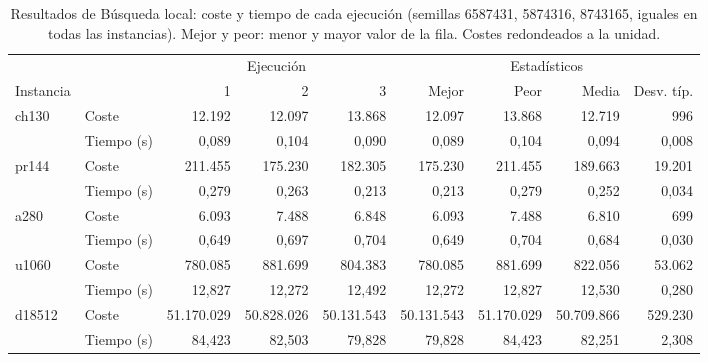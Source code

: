 \begin{table}[H]
\centering\small\setlength{\tabcolsep}{4pt}\renewcommand{\arraystretch}{1.15}
\begin{adjustbox}{max width=\textwidth}
\begin{tabular}{llrrrrrrr}
\toprule
 & & \multicolumn{3}{c}{Ejecución} & \multicolumn{4}{c}{Estadísticos} \\
\cmidrule(lr){3-5}\cmidrule(lr){6-9}
Instancia & & 1 & 2 & 3 & Mejor & Peor & Media & Desv. típ. \\
\midrule
\rowcolor{gray!10}ch130 & Coste & 12{.}192 & 12{.}097 & 13{.}868 & 12{.}097 & 13{.}868 & 12{.}719 & 996 \\
\rowcolor{gray!10} & Tiempo (s) & 0{,}089 & 0{,}104 & 0{,}090 & 0{,}089 & 0{,}104 & 0{,}094 & 0{,}008 \\
pr144 & Coste & 211{.}455 & 175{.}230 & 182{.}305 & 175{.}230 & 211{.}455 & 189{.}663 & 19{.}201 \\
 & Tiempo (s) & 0{,}279 & 0{,}263 & 0{,}213 & 0{,}213 & 0{,}279 & 0{,}252 & 0{,}034 \\
\rowcolor{gray!10}a280 & Coste & 6{.}093 & 7{.}488 & 6{.}848 & 6{.}093 & 7{.}488 & 6{.}810 & 699 \\
\rowcolor{gray!10} & Tiempo (s) & 0{,}649 & 0{,}697 & 0{,}704 & 0{,}649 & 0{,}704 & 0{,}684 & 0{,}030 \\
u1060 & Coste & 780{.}085 & 881{.}699 & 804{.}383 & 780{.}085 & 881{.}699 & 822{.}056 & 53{.}062 \\
 & Tiempo (s) & 12{,}827 & 12{,}272 & 12{,}492 & 12{,}272 & 12{,}827 & 12{,}530 & 0{,}280 \\
\rowcolor{gray!10}d18512 & Coste & 51{.}170{.}029 & 50{.}828{.}026 & 50{.}131{.}543 & 50{.}131{.}543 & 51{.}170{.}029 & 50{.}709{.}866 & 529{.}230 \\
\rowcolor{gray!10} & Tiempo (s) & 84{,}423 & 82{,}503 & 79{,}828 & 79{,}828 & 84{,}423 & 82{,}251 & 2{,}308 \\
\bottomrule
\end{tabular}
\end{adjustbox}
\caption[Resultados de Búsqueda local]{Resultados de Búsqueda local: coste y tiempo de cada ejecución (semillas 6587431, 5874316, 8743165, iguales en todas las instancias). Mejor y peor: menor y mayor valor de la fila. Costes redondeados a la unidad.}
\label{tab:b_local-res}
\end{table}
